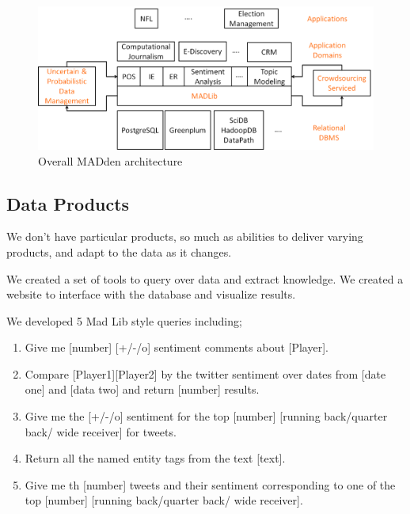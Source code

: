 \documentclass[11pt]{article}
\newcommand{\system}{MADden\xspace}
\begin{document}
  \begin{figure}
    \begin{center}
      \includegraphics[scale=0.3]{altachitecture.png}
      \caption{Overall {\system} architecture}
      \label{fig:altarch}
    \end{center}
  \end{figure}





  \subsection{Data Products}

  We don't have particular products, so much as abilities to deliver varying products, and adapt to the data as it changes.


	We created a set of tools to query over data and extract knowledge.
	We created a website to interface with the database and visualize results.


	We developed 5  Mad Lib style queries including;
	\begin{enumerate}
	\item Give me [number] [+/-/o] sentiment comments about [Player].
	\item Compare [Player1][Player2] by the twitter sentiment	over dates from
	[date one] and [data two] and return [number] results.
	\item Give me the [+/-/o] sentiment for the top [number] 
	[running back/quarter back/ wide receiver] for tweets.
	\item Return all the named entity tags from the text [text].
	\item Give me th [number] tweets and their sentiment corresponding to 
	one of the top [number]  [running back/quarter back/ wide receiver].
	\end{enumerate}
\end{document}
